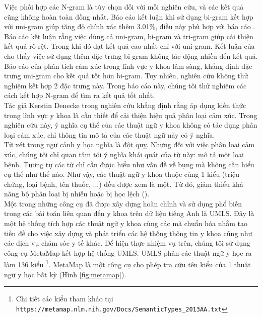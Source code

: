 Việc phối hợp các N-gram là tùy chọn đối với mỗi nghiên cứu, và các kết quả cũng không hoàn toàn đồng nhất. Báo cáo \cite{niu2005analysis} kết luận khi sử dụng bi-gram kết hợp với uni-gram giúp tăng độ chính xác thêm 3.01\%, điều này phù hợp với báo cáo \cite{sarker2011outcome}. Báo cáo \cite{sarker2011outcome} kết luận rằng việc dùng cả uni-gram, bi-gram và tri-gram giúp cải thiện kết quả rõ rệt. Trong khi đó \cite{pang2002thumbs} đạt kết quả cao nhất chỉ với uni-gram. Kết luận của \cite{pang2002thumbs} cho thấy việc sử dụng thêm đặc trưng bi-gram không tác động nhiều đến kết quả. Báo cáo của \cite{smith2012cross} phân tích cảm xúc trong lĩnh vực y khoa lâm sàng, khẳng định đặc trưng uni-gram cho kết quả tốt hơn bi-gram. Tuy nhiên, nghiên cứu không thử nghiệm kết hợp 2 đặc trưng này. Trong báo cáo này, chúng tôi thử nghiệm các cách kết hợp N-gram để tìm ra kết quả tốt nhất.\\

Tác giả Kerstin Denecke trong nghiên cứu \cite{denecke2015sentiment} khẳng định rằng áp dụng kiến thức trong lĩnh vực y khoa là cần thiết để cải thiện hiệu quả phân loại cảm xúc. Trong nghiên cứu này, ý nghĩa cụ thể của các thuật ngữ y khoa không có tác dụng phân loại cảm xúc, chỉ thông tin mô tả của các thuật ngữ này có ý nghĩa.\\

Từ  xét trong ngữ cảnh y học nghĩa là đột quỵ. Nhưng đối với việc phân loại cảm xúc, chúng tôi chỉ quan tâm tới ý nghĩa khái quát của từ này:  mô tả một loại bệnh. Tương tự các từ  chỉ cần được hiểu như vấn đề về bụng mà không cần hiểu cụ thể như thế nào. Như vậy, các thuật ngữ y khoa thuộc cùng 1 kiểu (triệu chứng, loại bệnh, tên thuốc, ...) đều được xem là một. Từ đó, giảm thiểu khả năng bộ phân loại bị nhiễu hoặc bị học lệch ().\\

Một trong những công cụ đã được xây dựng hoàn chỉnh và sử dụng phổ biến trong các bài toán liên quan đến y khoa trên dữ liệu tiếng Anh là UMLS. Đây là một hệ thống tích hợp các thuật ngữ y khoa cùng các mã chuẩn hóa nhằm tạo tiền đề cho việc xây dựng và phát triển các hệ thống thông tin y khoa cũng như các dịch vụ chăm sóc y tế khác. Để hiện thực nhiệm vụ trên, chúng tôi sử dụng công cụ MetaMap kết hợp hệ thống UMLS. UMLS phân các thuật ngữ y học ra làm 136 kiểu \footnote{Chi tiết các kiểu tham khảo tại \texttt{https://metamap.nlm.nih.gov/Docs/SemanticTypes\_2013AA.txt}}. MetaMap là một công cụ cho phép tra cứu tên kiểu của 1 thuật ngữ y học bất kỳ (Hình \ref{fig:metamap}).\\

